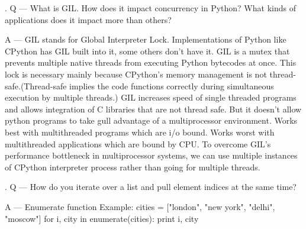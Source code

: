 \documentclass{article}
\newcounter{question}
\begin{document}
\newcommand\Que[1]{%
   \leavevmode\par
   \stepcounter{question}
   \noindent
   \thequestion. Q --- #1\par}

\newcommand\Ans[2][]{%
   \leavevmode\par\noindent
   {\leftskip37pt
   A --- \textbf{#1}#2\par}}

\Que{What is GIL. How does it impact concurrency in Python? What kinds of applications does it impact more than others?}
\Ans{GIL stands for Global Interpreter Lock. Implementations of Python like CPython has GIL built into it, some others don't have it. GIL is a mutex that prevents multiple native threads from executing Python bytecodes at once. This lock is necessary mainly because CPython's memory management is not thread-safe.(Thread-safe implies the code functions correctly during simultaneous execution by multiple threads.) GIL increases speed of single threaded programs and allows integration of C libraries that are not thread safe. But it doesn't allow python programs to take gull advantage of a multiprocessor environment. Works best with multithreaded programs which are i/o bound. Works worst with multithreaded applications which are bound by CPU. To overcome GIL's performance bottleneck in multiprocessor systems, we can use multiple instances of CPython interpreter process rather than going for multiple threads.}

\Que{How do you iterate over a list and pull element indices at the same time?}
\Ans{Enumerate function
Example:
	cities = ["london", "new york", "delhi", "moscow"]
	for i, city in enumerate(cities):
		print i, city
}
\end{document}
